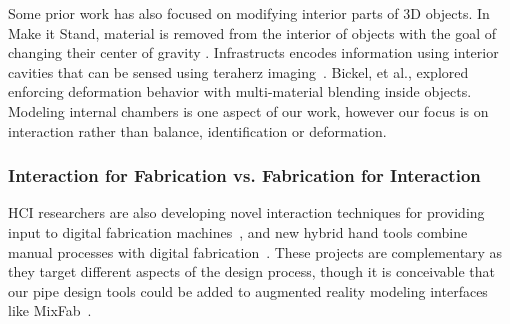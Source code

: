 Some prior work has also focused on modifying interior parts of 3D objects. 
In Make it Stand, material is removed from the interior of objects with the goal of changing their center of gravity \cite{Prevost-makeitstand}. Infrastructs encodes information using interior cavities that can be sensed using teraherz imaging~\cite{Willis-infrastructs}. Bickel, et al., explored enforcing deformation behavior with multi-material blending inside objects\cite{Bickel-deformation}. Modeling internal chambers is one aspect of our work, however our focus is on interaction rather than balance, identification or deformation.  

\subsubsection{Interaction for Fabrication vs. Fabrication for Interaction}
HCI researchers are also developing novel interaction techniques for providing input to digital fabrication machines~\cite{Mueller-constructable,Willis-interactive,mixfab}, and new hybrid hand tools combine manual processes with digital fabrication~\cite{zoran2013freed,rivers2012position}. These projects are complementary as they target different aspects of the design process, though it is conceivable that our pipe design tools could be added to augmented reality modeling interfaces like MixFab~\cite{mixfab}.